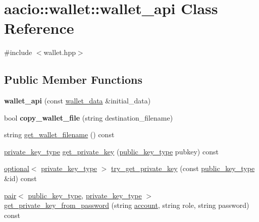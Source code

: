 \hypertarget{classaacio_1_1wallet_1_1wallet__api}{}\section{aacio\+:\+:wallet\+:\+:wallet\+\_\+api Class Reference}
\label{classaacio_1_1wallet_1_1wallet__api}


{\ttfamily \#include $<$wallet.\+hpp$>$}

\subsection*{Public Member Functions}
\begin{DoxyCompactItemize}
\item 
\mbox{\label{classaacio_1_1wallet_1_1wallet__api_aa401c5b296b3cecff815bbe138a8f06e}} 
{\bfseries wallet\+\_\+api} (const \mbox{\hyperlink{structaacio_1_1wallet_1_1wallet__data}{wallet\+\_\+data}} \&initial\+\_\+data)
\item 
\mbox{\label{classaacio_1_1wallet_1_1wallet__api_ac9339543008c61275bf9d50648f38111}} 
bool {\bfseries copy\+\_\+wallet\+\_\+file} (string destination\+\_\+filename)
\item 
string \mbox{\hyperlink{classaacio_1_1wallet_1_1wallet__api_a19392c5f842b71fb212e1ab126506876}{get\+\_\+wallet\+\_\+filename}} () const
\item 
\mbox{\hyperlink{classfc_1_1crypto_1_1private__key}{private\+\_\+key\+\_\+type}} \mbox{\hyperlink{classaacio_1_1wallet_1_1wallet__api_ad9da1f4d4f7af4b2c5e153b89328f5f0}{get\+\_\+private\+\_\+key}} (\mbox{\hyperlink{classfc_1_1crypto_1_1public__key}{public\+\_\+key\+\_\+type}} pubkey) const
\item 
\mbox{\hyperlink{classaacio_1_1optional}{optional}}$<$ \mbox{\hyperlink{classfc_1_1crypto_1_1private__key}{private\+\_\+key\+\_\+type}} $>$ \mbox{\hyperlink{classaacio_1_1wallet_1_1wallet__api_a96aa8527eb1219e885c8d0371a6ccf1f}{try\+\_\+get\+\_\+private\+\_\+key}} (const \mbox{\hyperlink{classfc_1_1crypto_1_1public__key}{public\+\_\+key\+\_\+type}} \&id) const
\item 
\mbox{\hyperlink{structpair}{pair}}$<$ \mbox{\hyperlink{classfc_1_1crypto_1_1public__key}{public\+\_\+key\+\_\+type}}, \mbox{\hyperlink{classfc_1_1crypto_1_1private__key}{private\+\_\+key\+\_\+type}} $>$ \mbox{\hyperlink{classaacio_1_1wallet_1_1wallet__api_a5d8d935bdae2e2d77073899f6c0f51e7}{get\+\_\+private\+\_\+key\+\_\+from\+\_\+password}} (string \mbox{\hyperlink{structaccount}{account}}, string role, string password) const

\end{DoxyCompactItemize}
